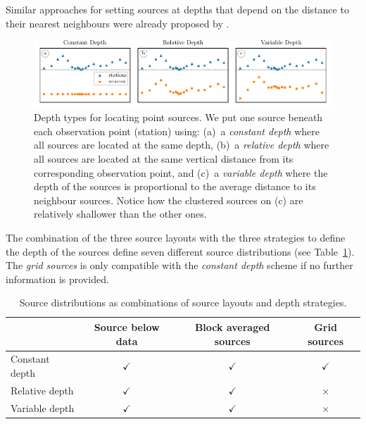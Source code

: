 \documentclass[twocolumn]{article}
\begin{document}
Similar approaches for setting sources at depths that depend
on the distance to their nearest neighbours were already proposed by
\citet{cordell1992, guspi2004, guspi2009}.

\begin{figure}
    \includegraphics[width=\linewidth]{figs/depth_types.pdf}
    \caption{
        Depth types for locating point sources. We put one source beneath each
        observation point (station) using:
        (a)~a \emph{constant depth} where all sources are located at the same
           depth,
        (b)~a \emph{relative depth} where all sources are located at the same
           vertical distance from its corresponding observation point, and
        (c)~a \emph{variable depth} where the depth of the sources is
           proportional to the average distance to its neighbour sources.
           Notice how the clustered sources on (c) are relatively shallower
           than the
           other ones.
    }
    \label{fig:depth-types}
\end{figure}

The combination of the three source layouts with the three strategies to define
the depth of the sources define seven different source distributions (see
Table~\ref{tab:source-distributions}).
The \emph{grid sources} is only compatible with the \emph{constant depth}
scheme if no further information is provided.

\begin{table}
    \centering
    \caption{
        Source distributions as combinations of source layouts and depth
        strategies.
    }
    \label{tab:source-distributions}
    \begin{tabular}{lccc}
        & Source below data & Block averaged sources & Grid sources \\ \hline
        Constant depth & $\checkmark$ & $\checkmark$ & $\checkmark$ \\
        Relative depth & $\checkmark$ & $\checkmark$ & $\times$     \\
        Variable depth & $\checkmark$ & $\checkmark$ & $\times$     \\
    \end{tabular}
\end{table}
\end{document}
